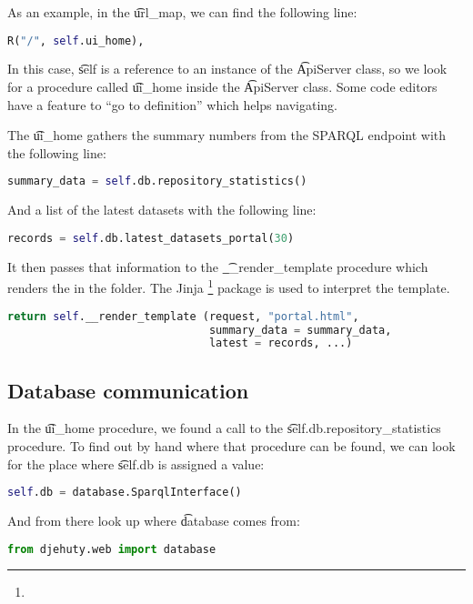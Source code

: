 As an example, in the \t{url\_map}, we can find the following line:
\begin{lstlisting}[language=python]
R("/", self.ui_home),
\end{lstlisting}

In this case, \t{self} is a reference to an instance of the \t{ApiServer}
class, so we look for a procedure called \t{ui\_home} inside the
\t{ApiServer} class.  Some code editors have a feature to ``go to definition''
which helps navigating.

The \t{ui\_home} gathers the summary numbers from the SPARQL endpoint
with the following line:
\begin{lstlisting}[language=python]
summary_data = self.db.repository_statistics()
\end{lstlisting}

And a list of the latest datasets with the following line:
\begin{lstlisting}[language=python]
records = self.db.latest_datasets_portal(30)
\end{lstlisting}

It then passes that information to the \t{\_\_render\_template}
procedure which renders the  in the
 folder.  The Jinja%
\footnote{} package
is used to interpret the template.

\begin{lstlisting}[language=python]
return self.__render_template (request, "portal.html",
                               summary_data = summary_data,
                               latest = records, ...)
\end{lstlisting}

\subsection{Database communication}

In the \t{ui\_home} procedure, we found a call to the
\t{self.db.repository\_statistics} procedure.  To find out by hand where that
procedure can be found, we can look for the place where \t{self.db} is
assigned a value:

\begin{lstlisting}[language=python]
self.db = database.SparqlInterface()
\end{lstlisting}

And from there look up where \t{database} comes from:
\begin{lstlisting}[language=python]
from djehuty.web import database
\end{lstlisting}

